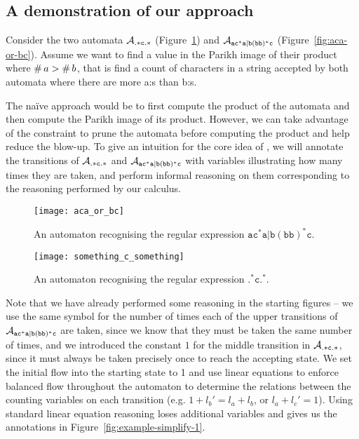 \documentclass[acmsmall,review,anonymous]{acmart}\settopmatter{printfolios=true,printccs=false,printacmref=true}
\theoremstyle{definition}
\begin{document}
\subsection{A demonstration of our approach}

Consider the two automata $\mathcal{A}_{\mathtt{.*c.*}}{}$
(Figure~\ref{fig:something-c-something}) and $\mathcal{A}_{\mathtt{ac^*a|b(bb)^*c}}{}$
(Figure~\ref{fig:aca-or-bc}). Assume we want to find a value in the Parikh image
of their product where $\operatorname{\#}{a} > \operatorname{\#}{b}$, that is find
a count of characters in a string accepted by both automata where there are more
a:s than b:s.

The na\"ive approach would be to first compute the product of the automata and
then compute the Parikh image of its product. However, we can take advantage of
the constraint to prune the automata before computing the product and help
reduce the blow-up. To give an intuition for the core idea of \Calculus{}, we
will annotate the transitions of $\mathcal{A}_{\mathtt{.*c.*}}$ and $\mathcal{A}_{\mathtt{ac^*a|b(bb)^*c}}$ with
variables illustrating how many times they are taken, and perform informal
reasoning on them corresponding to the reasoning performed by our calculus.

\begin{figure}[ht]
  \begin{minipage}[b]{0.75\linewidth}
  \centering 
    \texttt{[image: aca\_or\_bc]}
    \caption{An automaton recognising the regular expression
    $\mathtt{ac^*a|b(bb)^*c}$.}\label{fig:aca-or-bc}

    \texttt{[image: something\_c\_something]}
    \caption{An automaton recognising the regular expression
    $\mathtt{.^*c.^*}$.}\label{fig:something-c-something}
  \end{minipage}
  \end{figure}


Note that we have already performed some reasoning in the starting figures -- we
use the same symbol for the number of times each of the upper transitions of
$\mathcal{A}_{\mathtt{ac^*a|b(bb)^*c}}$ are taken, since we know that they must be taken the same number of
times, and we introduced the constant $1$ for the middle transition in
$\mathcal{A}_{\mathtt{.*c.*}}$, since it must always be taken precisely once to reach
the accepting state. We set the initial flow into the starting state to 1 and
use linear equations to enforce balanced flow throughout the automaton to
determine the relations between the counting variables on each transition (e.g.
$1 + {l_b}' = l_a + l_b$, or $l_a + l_c' = 1$). Using standard linear equation
reasoning loses additional variables and gives us the annotations in
Figure~\ref{fig:example-simplify-1}. 
\end{document}

